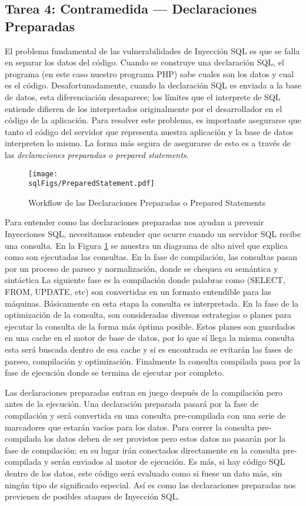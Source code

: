 \subsection{Tarea 4: Contramedida --- Declaraciones Preparadas} 

El problema fundamental de las vulnerabilidades de Inyección SQL es que se falla en separar los datos del código. Cuando se construye una declaración SQL, el programa (en este caso nuestro programa PHP) sabe cuales son los datos y cual es el código. 
Desafortunadamente, cuando la declaración SQL es enviada a la base de datos, esta diferenciación desaparece; los límites que el interprete de SQL entiende difieren de los interpretados originalmente por el desarrollador en el código de la aplicación.
Para resolver este problema, es importante asegurarse que tanto el código del servidor que representa nuestra aplicación y la base de datos interpreten lo mismo. La forma más segura de asegurarse de esto es a través de las \textit{declaraciones preparadas o prepared statements}. 

\begin{figure}
\centering
\texttt{[image: \\sqlFigs/PreparedStatement.pdf]}
\caption{Workflow de las Declaraciones Preparadas o Prepared Statements}
\label{sql:fig:preparedstatement}
\end{figure}

Para entender como las declaraciones preparadas nos ayudan a prevenir Inyecciones SQL, necesitamos entender que ocurre cuando un servidor SQL recibe una consulta.
En la Figura \ref{sql:fig:preparedstatement} se muestra un diagrama de alto nivel que explica como son ejecutadas las consultas.
En la fase de compilación, las consultas pasan por un proceso de parseo y normalización, donde se chequea su semántica y sintáctica
La siguiente fase es la compilación donde palabras como (SELECT, FROM, UPDATE, etc) son convertidas en un formato entendible para las máquinas. Básicamente en esta etapa la consulta es interpretada.
En la fase de la optimización de la consulta, son consideradas diversas estrategias o planes para ejecutar la consulta de la forma más óptima posible. Estos planes son guardados en una cache en el motor de base de datos, por lo que sí llega la misma consulta esta será buscada dentro de esa cache y si es encontrada se evitarán las fases de parseo, compilación y optimización. Finalmente la consulta compilada pasa por la fase de ejecución donde se termina de ejecutar por completo.

Las declaraciones preparadas entran en juego después de la compilación pero antes de la ejecución.
Una declaración preparada pasará por la fase de compilación y será convertida en una consulta pre-compilada con una serie de marcadores que estarán vacíos para los datos. Para correr la consulta pre-compilada los datos deben de ser provistos pero estos datos no pasarán por la fase de compilación; en su lugar irán conectados directamente en la consulta pre-compilada y serán enviados al motor de ejecución.
Es más, si hay código SQL dentro de los datos, este código será evaluado como si fuese un dato más, sin ningún tipo de significado especial.
Así es como las declaraciones preparadas nos previenen de posibles ataques de Inyección SQL.

